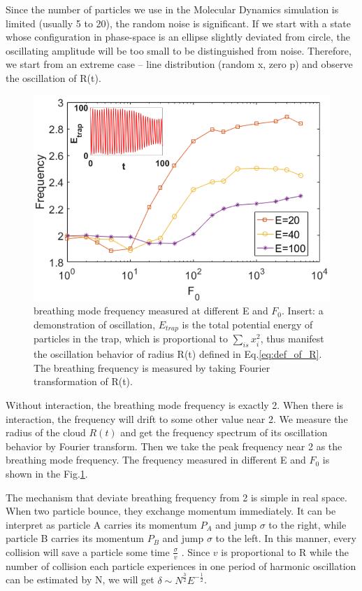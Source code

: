 \documentclass[aps,pre,twocolumn,groupedaddress]{revtex4-1}
\begin{document}
Since the number of particles we use in the Molecular Dynamics simulation is limited (usually 5 to 20), the random noise is significant. If we start with a state whose configuration in phase-space is an ellipse slightly deviated from circle, the oscillating amplitude will be too small to be distinguished from noise. Therefore, we start from an extreme case -- line distribution (random x, zero p) and observe the oscillation of R(t). 
\begin{figure}[hbtp]
\center
\includegraphics[scale=0.32]{ZhiyuPictures/freq_scanF_differentE_log_2_with_oscillation_demo.png}
\caption{breathing mode frequency measured at different E and $F_0$. Insert: a demonstration of oscillation, $E_{trap}$ is the total potential energy of particles in the trap, which is proportional to $\sum_{is}{x_i^2}$, thus manifest the oscillation behavior of radius R(t) defined in Eq.\ref{eq:def_of_R}. The breathing frequency is measured by taking Fourier transformation of R(t).}
\label{fig:Breathingfrequency1}
\end{figure}

Without interaction, the breathing mode frequency is exactly 2. When there is interaction, the frequency will drift to some other value near 2. We measure the radius of the cloud $R(t)$ and get the frequency spectrum of its oscillation behavior by Fourier transform. Then we take the peak frequency near 2 as the breathing mode frequency. The frequency measured in different E and $F_0$ is shown in the Fig.\ref{fig:Breathingfrequency1}.

The mechanism that deviate breathing frequency from 2 is simple in real space. When two particle bounce, they exchange momentum immediately. It can be interpret as particle A carries its momentum $P_A$ and jump $\sigma$ to the right, while particle B carries its momentum $P_B$ and jump $\sigma$ to the left. In this manner, every collision will save a particle some time $\frac{\sigma}{v}$ . Since $v$ is proportional to R while the number of collision each particle experiences in one period of harmonic oscillation can be estimated by N, we will get $\delta\sim N^{\frac{3}{2}}E^{-\frac{1}{2}}$. 
\end{document}
